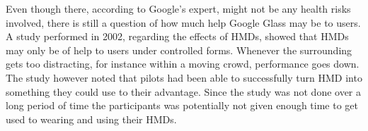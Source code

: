 %
Even though there, according to Google's expert, might not be any health risks involved, there is still a question of how much help Google Glass may be to users. A study performed in 2002\cite{laramee02}, regarding the effects of HMDs, showed that HMDs may only be of help to users under controlled forms. Whenever the surrounding gets too distracting, for instance within a moving crowd, performance goes down. The study however noted that pilots had been able to successfully turn HMD into something they could use to their advantage. Since the study was not done over a long period of time the participants was potentially not given enough time to get used to wearing and using their HMDs.

